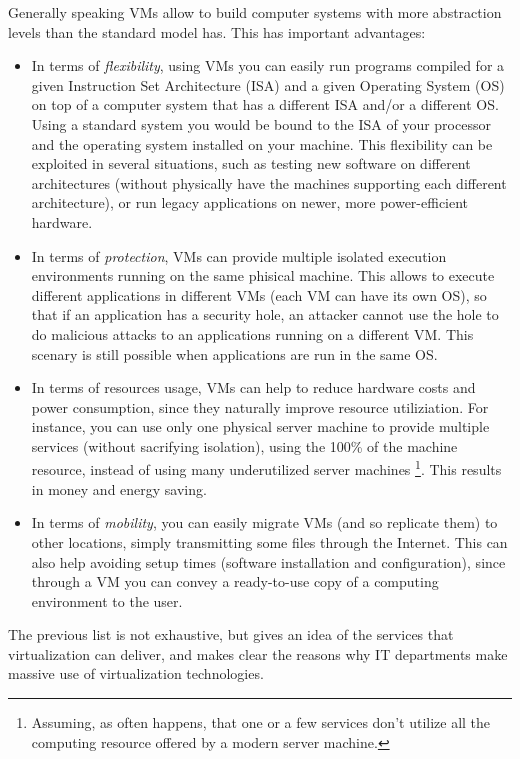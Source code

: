 Generally speaking VMs allow to build computer systems with more abstraction levels than the standard model has. This has important
advantages:
\begin{itemize}
  \item In terms of \emph{flexibility}, using VMs you can easily run programs compiled for a given Instruction Set Architecture (ISA) 
	and a given Operating System (OS) on top of a computer system that has a different ISA and/or a different OS. Using a standard
	system you would be bound to the ISA of your processor and the operating system installed on your machine. This flexibility can be 
	exploited in several situations, such as testing new software on different architectures (without physically have the
	machines supporting each different architecture), or run legacy applications on newer, more power-efficient hardware.

  \item In terms of \emph{protection}, VMs can provide multiple isolated execution environments running on the same phisical machine.
	This allows to execute different applications in different VMs (each VM can have its own OS), so that if an application has a
	security hole, an attacker cannot use the hole to do malicious attacks to an applications running on a different VM. 
	This scenary is still possible when applications are run in the same OS.
	
  \item In terms of resources usage, VMs can help to reduce hardware costs and power consumption, since they naturally improve 
	resource utiliziation. For instance, you can use only one physical server machine to provide multiple services (without 
	sacrifying isolation), using the 100\% of the machine resource, instead of using many underutilized server machines
	\footnote{Assuming, as often happens, that one or a few services don't utilize all the computing resource offered by
	a modern server machine.}. This results in money and energy saving.
	
  \item In terms of \emph{mobility}, you can easily migrate VMs (and so replicate them) to other locations, simply transmitting 
	some files through the Internet. This can also help avoiding setup times (software installation and configuration), 
	since through a VM you can convey a ready-to-use copy of a computing environment to the user.
\end{itemize}

The previous list is not exhaustive, but gives an idea of the services that virtualization can deliver, and makes clear the reasons
why IT departments make massive use of virtualization technologies.



